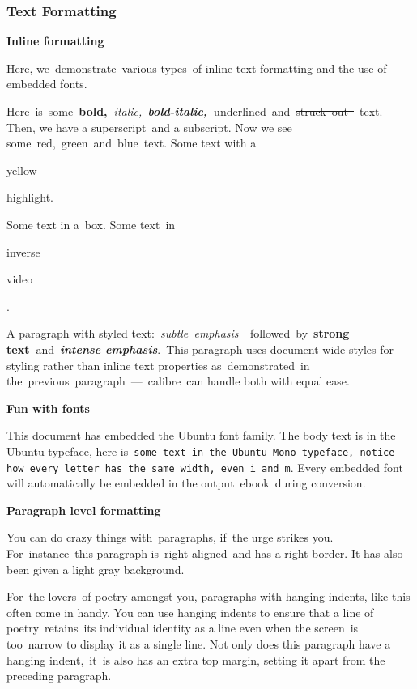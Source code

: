 \documentclass[\officeparserdriver aspectratio=169,12pt,xcolor=table]{beamer}
\providecommand{\ophlaaaaaa}[1]{{\setlength{\fboxsep}{1pt}\colorbox{hex000000}{\strut #1}}}
\providecommand{\ophlppppaa}[1]{{\setlength{\fboxsep}{1pt}\colorbox{hexFFFF00}{\strut #1}}}
\begin{document}
\begin{frame}[allowframebreaks]
\frametitle{\protect\textcolor{hex365F91}{Text Formatting}}
\label{text-formatting}
\textcolor{hex4F81BD}{\textbf{{\fontsize{13pt}{15.6pt}\selectfont Inline formatting}}}

\textcolor{hex000000}{Here, we~demonstrate~various types~of inline text formatting and the use of embedded fonts.}

\textcolor{hex000000}{Here~is~some~}\textcolor{hex000000}{\textbf{bold,~}}\textcolor{hex000000}{\textit{italic,~}}\textcolor{hex000000}{\textit{\textbf{bold-italic,~}}}\textcolor{hex000000}{\uline{underlined~}}\textcolor{hex000000}{and~}\textcolor{hex000000}{\sout{struck~out~}}\textcolor{hex000000}{~text. Then, we have a superscript~and a subscript. Now we see some~}\textcolor{hexFF0000}{red}\textcolor{hex000000}{,~}\textcolor{hex92D050}{green}\textcolor{hex000000}{~and~}\textcolor{hex0070C0}{blue}\textcolor{hex000000}{~text. Some text with a~}\textcolor{hex000000}{\ophlppppaa{yellow} \ophlppppaa{highlight.}}\textcolor{hex000000}{ Some text in a~box. Some text~in~}\textcolor{hexFFFFFF}{\ophlaaaaaa{inverse} \ophlaaaaaa{video}}\textcolor{hex000000}{.}

\textcolor{hex000000}{A paragraph with styled text:~}\textcolor{hex808080}{\textit{subtle~emphasis~~}}\textcolor{hex000000}{followed~by~}\textcolor{hex000000}{\textbf{strong text~}}\textcolor{hex000000}{and~}\textcolor{hex4F81BD}{\textit{\textbf{intense emphasis}}}\textcolor{hex000000}{.~This paragraph uses document wide styles for styling rather than inline text properties as~demonstrated~in the~previous~paragraph~—~calibre~can handle both with equal ease.}

\textcolor{hex4F81BD}{\textbf{{\fontsize{13pt}{15.6pt}\selectfont Fun with fonts}}}

\textcolor{hex000000}{This document has embedded the Ubuntu font family. The body text is in the Ubuntu typeface, here is~}\textcolor{hex000000}{\texttt{some text in the Ubuntu Mono typeface, notice how every letter has the same width, even~i~and m}}\textcolor{hex000000}{. Every embedded font will automatically be embedded in the output~ebook~during conversion.~}

\textcolor{hex4F81BD}{\textbf{{\fontsize{13pt}{15.6pt}\selectfont Paragraph level formatting}}}

{\raggedleft \textcolor{hex000000}{You can do crazy things with~paragraphs, if~the urge strikes you. For~instance~this paragraph is~right aligned~and has a right border. It has also been given a light gray background.}\par}

\textcolor{hex000000}{For~the lovers~of poetry amongst you, paragraphs with hanging indents, like this often come in handy. You can use hanging indents to ensure that a line of poetry~retains~its individual identity as a line even when the screen~is~ too~narrow to display it as a single line. Not only does this paragraph have a hanging indent,~it~is also has an extra top margin, setting it apart from the preceding paragraph.}
\end{frame}
\end{document}
